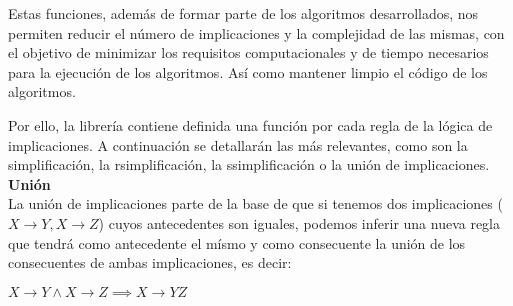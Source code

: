 Estas funciones, adem\'as de formar parte de los algoritmos desarrollados, nos permiten reducir el n\'umero de 
implicaciones y la complejidad de las mismas, con el objetivo de minimizar los requisitos computacionales y de tiempo
necesarios para la ejecuci\'on de los algoritmos. As\'i como mantener limpio el c\'odigo de los algoritmos.










Por ello, la librer\'ia contiene definida una funci\'on por cada regla de la l\'ogica de implicaciones. A continuaci\'on se detallar\'an las m\'as relevantes, como son la simplificaci\'on, la rsimplificaci\'on, la ssimplificaci\'on o la uni\'on de implicaciones.\\

\textbf{Uni\'on}\\
La uni\'on de implicaciones parte de la base de que si tenemos dos implicaciones (\(X \to Y , X \to Z\)) cuyos antecedentes son iguales, podemos inferir una nueva regla que tendr\'a como antecedente el m\'ismo y como consecuente la uni\'on de los consecuentes de ambas implicaciones, es decir:

\begin{center}
    \(X \to Y \wedge X \to Z \implies X \to YZ \)
\end{center}

